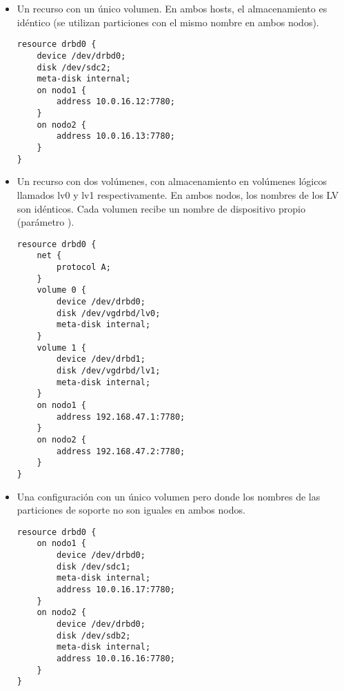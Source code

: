 \begin{itemize}
	\item Un recurso con un único volumen. En ambos hosts, el almacenamiento es idéntico (se utilizan particiones con el mismo nombre en ambos nodos).
\begin{lstlisting}
resource drbd0 {
	device /dev/drbd0;
	disk /dev/sdc2;
	meta-disk internal;
	on nodo1 {
		address 10.0.16.12:7780;
	}
	on nodo2 {
		address 10.0.16.13:7780;
	}
}
\end{lstlisting}

\item Un recurso con dos volúmenes, con almacenamiento en volúmenes lógicos llamados lv0 y lv1 respectivamente. En ambos nodos, los nombres de los LV son idénticos. Cada volumen recibe un nombre de dispositivo propio (parámetro ).

\begin{lstlisting}
resource drbd0 {
	net {
		protocol A;
	}
	volume 0 {
		device /dev/drbd0;
		disk /dev/vgdrbd/lv0;
		meta-disk internal;
	}
	volume 1 {
		device /dev/drbd1;
		disk /dev/vgdrbd/lv1;
		meta-disk internal;
	}
	on nodo1 {
		address	192.168.47.1:7780;
	}
	on nodo2 {
		address	192.168.47.2:7780;
	}
}
\end{lstlisting}
\item Una configuración con un único volumen pero donde los nombres de las particiones de soporte no son iguales en ambos nodos.
\begin{lstlisting}
resource drbd0 {
	on nodo1 {
		device /dev/drbd0;
		disk /dev/sdc1;
        meta-disk internal;
		address 10.0.16.17:7780;
	}
	on nodo2 {
		device /dev/drbd0;
        disk /dev/sdb2;
        meta-disk internal;
		address 10.0.16.16:7780;
	}
}
\end{lstlisting}
\end{itemize}
